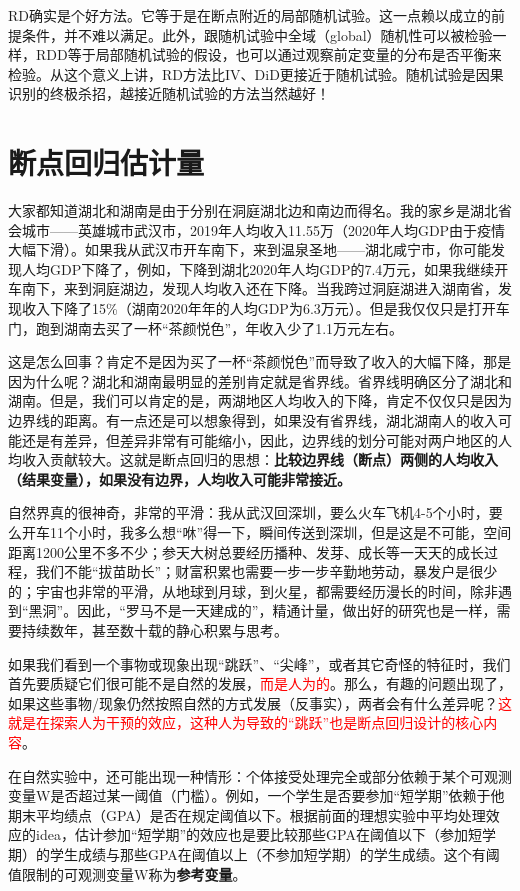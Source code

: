 \documentclass[cn,12pt,math=newtx,citestyle=gb7714-2015,bibstyle=gb7714-2015]{elegantbook}
\begin{document}
	RD确实是个好方法。它等于是在断点附近的局部随机试验。这一点赖以成立的前提条件，并不难以满足。此外，跟随机试验中全域（global）随机性可以被检验一样，RDD等于局部随机试验的假设，也可以通过观察前定变量的分布是否平衡来检验。从这个意义上讲，RD方法比IV、DiD更接近于随机试验。随机试验是因果识别的终极杀招，越接近随机试验的方法当然越好！
	
	\section{断点回归估计量}
	大家都知道湖北和湖南是由于分别在洞庭湖北边和南边而得名。我的家乡是湖北省会城市——英雄城市武汉市，2019年人均收入11.55万（2020年人均GDP由于疫情大幅下滑）。如果我从武汉市开车南下，来到温泉圣地——湖北咸宁市，你可能发现人均GDP下降了，例如，下降到湖北2020年人均GDP的7.4万元，如果我继续开车南下，来到洞庭湖边，发现人均收入还在下降。当我跨过洞庭湖进入湖南省，发现收入下降了15\%（湖南2020年年的人均GDP为6.3万元）。但是我仅仅只是打开车门，跑到湖南去买了一杯“茶颜悦色”，年收入少了1.1万元左右。
	
	这是怎么回事？肯定不是因为买了一杯“茶颜悦色”而导致了收入的大幅下降，那是因为什么呢？湖北和湖南最明显的差别肯定就是省界线。省界线明确区分了湖北和湖南。但是，我们可以肯定的是，两湖地区人均收入的下降，肯定不仅仅只是因为边界线的距离。有一点还是可以想象得到，如果没有省界线，湖北湖南人的收入可能还是有差异，但差异非常有可能缩小，因此，边界线的划分可能对两户地区的人均收入贡献较大。这就是断点回归的思想：\textbf{比较边界线（断点）两侧的人均收入（结果变量），如果没有边界，人均收入可能非常接近。}
	
	自然界真的很神奇，非常的平滑：我从武汉回深圳，要么火车飞机4-5个小时，要么开车11个小时，我多么想“咻”得一下，瞬间传送到深圳，但是这是不可能，空间距离1200公里不多不少；参天大树总要经历播种、发芽、成长等一天天的成长过程，我们不能“拔苗助长”；财富积累也需要一步一步辛勤地劳动，暴发户是很少的；宇宙也非常的平滑，从地球到月球，到火星，都需要经历漫长的时间，除非遇到“黑洞”。因此，“罗马不是一天建成的”，精通计量，做出好的研究也是一样，需要持续数年，甚至数十载的静心积累与思考。
	
	如果我们看到一个事物或现象出现“跳跃”、“尖峰”，或者其它奇怪的特征时，我们首先要质疑它们很可能不是自然的发展，\textcolor{red}{而是人为的}。那么，有趣的问题出现了，如果这些事物/现象仍然按照自然的方式发展（反事实），两者会有什么差异呢？\textcolor{red}{这就是在探索人为干预的效应，这种人为导致的“跳跃”也是断点回归设计的核心内容}。
	
	在自然实验中，还可能出现一种情形：个体接受处理完全或部分依赖于某个可观测变量W是否超过某一阈值（门槛）。例如，一个学生是否要参加“短学期”依赖于他期末平均绩点（GPA）是否在规定阈值以下。根据前面的理想实验中平均处理效应的idea，估计参加“短学期”的效应也是要比较那些GPA在阈值以下（参加短学期）的学生成绩与那些GPA在阈值以上（不参加短学期）的学生成绩。这个有阈值限制的可观测变量W称为\textbf{参考变量}。
	
\end{document}
